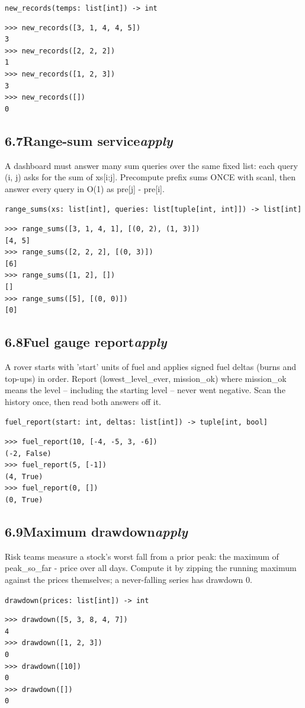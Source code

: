 \documentclass[10pt,letterpaper]{book}
\begin{document}
\noindent\texttt{new\_records(temps: list[int]) -> int}
\begin{lstlisting}[style=ex]
>>> new_records([3, 1, 4, 4, 5])
3
>>> new_records([2, 2, 2])
1
>>> new_records([1, 2, 3])
3
>>> new_records([])
0
\end{lstlisting}
\subsection*{6.7\quad Range-sum service\hfill\textnormal{\textit{apply}}}
A dashboard must answer many sum queries over the same fixed list: each query (i, j) asks for the sum of xs[i:j]. Precompute prefix sums ONCE with scanl, then answer every query in O(1) as pre[j] - pre[i].

\noindent\texttt{range\_sums(xs: list[int], queries: list[tuple[int, int]]) -> list[int]}
\begin{lstlisting}[style=ex]
>>> range_sums([3, 1, 4, 1], [(0, 2), (1, 3)])
[4, 5]
>>> range_sums([2, 2, 2], [(0, 3)])
[6]
>>> range_sums([1, 2], [])
[]
>>> range_sums([5], [(0, 0)])
[0]
\end{lstlisting}
\subsection*{6.8\quad Fuel gauge report\hfill\textnormal{\textit{apply}}}
A rover starts with 'start' units of fuel and applies signed fuel deltas (burns and top-ups) in order. Report (lowest\_level\_ever, mission\_ok) where mission\_ok means the level -- including the starting level -- never went negative. Scan the history once, then read both answers off it.

\noindent\texttt{fuel\_report(start: int, deltas: list[int]) -> tuple[int, bool]}
\begin{lstlisting}[style=ex]
>>> fuel_report(10, [-4, -5, 3, -6])
(-2, False)
>>> fuel_report(5, [-1])
(4, True)
>>> fuel_report(0, [])
(0, True)
\end{lstlisting}
\subsection*{6.9\quad Maximum drawdown\hfill\textnormal{\textit{apply}}}
Risk teams measure a stock's worst fall from a prior peak: the maximum of peak\_so\_far - price over all days. Compute it by zipping the running maximum against the prices themselves; a never-falling series has drawdown 0.

\noindent\texttt{drawdown(prices: list[int]) -> int}
\begin{lstlisting}[style=ex]
>>> drawdown([5, 3, 8, 4, 7])
4
>>> drawdown([1, 2, 3])
0
>>> drawdown([10])
0
>>> drawdown([])
0
\end{lstlisting}
\end{document}
